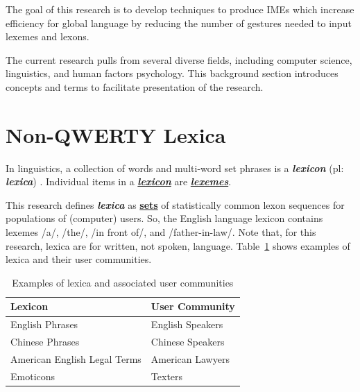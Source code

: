 The goal of this research is to develop techniques to produce IMEs which increase efficiency
for global language by reducing the number of gestures needed to input
lexemes and lexons.

The current research pulls from several diverse fields, including
computer science, linguistics, and human factors psychology. This
background section introduces concepts and terms to facilitate
presentation of the research.

\section{Non-QWERTY Lexica}\label{non-qwerty-lexica}
In linguistics, a collection of words and multi-word set phrases is a
\emph{\textbf{lexicon}} (pl: \emph{\textbf{lexica}}) \parencite{Masini2019MWEMorphology}.
Individual items in a \emph{\textbf{\uline{lexicon}}} are
\emph{\textbf{\uline{lexemes}}}.

This research defines \emph{\textbf{lexica}} as \textbf{\uline{sets}} of
statistically common lexon sequences for populations of (computer)
users. So, the English language lexicon contains lexemes /a/, /the/, /in
front of/, and /father-in-law/. Note that, for this research, lexica are
for written, not spoken, language. Table~\ref{tab:lexica-user-communities} shows examples of lexica and
their user communities.

\begin{table}[H]
	\centering
	\caption{Examples of lexica and associated user communities}
	\label{tab:lexica-user-communities}

	{%
		\setlength{\tabcolsep}{3pt}%
		\renewcommand{\arraystretch}{0.85}%

		\begin{tabular}{|l|l|}
			\hline
			\textbf{Lexicon} & \textbf{User Community} \\ \hline
			English Phrases             & English Speakers \\ \hline
			Chinese Phrases             & Chinese Speakers \\ \hline
			American English Legal Terms& American Lawyers \\ \hline
			Emoticons                   & Texters \\ \hline
		\end{tabular}
	}%

\end{table}




